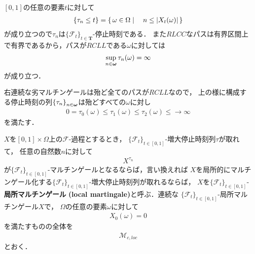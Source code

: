 	\begin{sketch}
		$[0,1]$の任意の要素$t$に対して
		\begin{align}
			\left\{\tau_n \leq t\right\} = \left\{\, \omega \in \Omega \mid \quad n \leq |X_t(\omega)|\, \right\}
		\end{align}
		が成り立つので$\tau_n$は$\{\mathscr{F}_t\}_{t \in \mathbf{T}}$-停止時刻である．
		また$RLCC$なパスは有界区間上で有界であるから，パスが$RCLL$である$\omega$に対しては
		\begin{align}
			\operatorname*{sup}_{n \in {\boldsymbol \omega}} \tau_n(\omega) = \infty
		\end{align}
		が成り立つ．
		\QED
	\end{sketch}
	
	右連続な劣マルチンゲールは殆ど全てのパスが$RCLL$なので，
	上の様に構成する停止時刻の列$\left\{\tau_n\right\}_{n \in {\boldsymbol \omega}}$は殆どすべての$\omega$に対し
	\begin{align}
		0 = \tau_0(\omega) \leq \tau_1(\omega) \leq \tau_2(\omega) \leq \longrightarrow \infty
	\end{align}
	を満たす．
	
	\begin{screen}
		\begin{dfn}[局所マルチンゲール]
			$X$を$[0,1] \times \Omega$上の$\mathscr{F}$-過程とするとき，
			$\{\mathscr{F}_{t}\}_{t \in [0,1]}$-増大停止時刻列$\tau$が取れて，
			任意の自然数$n$に対して
			\begin{align}
				X^{\tau_{n}}
			\end{align}
			が$\{\mathscr{F}_{t}\}_{t \in [0,1]}$-マルチンゲールとなるならば，言い換えれば
			$X$を局所的にマルチンゲール化する$\{\mathscr{F}_{t}\}_{t \in [0,1]}$-増大停止時刻列が取れるならば，
			$X$を$\{\mathscr{F}_{t}\}_{t \in [0,1]}$-{\bf 局所マルチンゲール}
			{\bf (local martingale)}と呼ぶ．連続な
			$\{\mathscr{F}_{t}\}_{t \in [0,1]}$-局所マルチンゲール$X$で，
			$\Omega$の任意の要素$\omega$に対して
			\begin{align}
				X_{0}(\omega) = 0
			\end{align}
			を満たすものの全体を
			\begin{align}
				\mathscr{M}_{c,loc}
			\end{align}
			とおく．
		\end{dfn}
	\end{screen}
	
